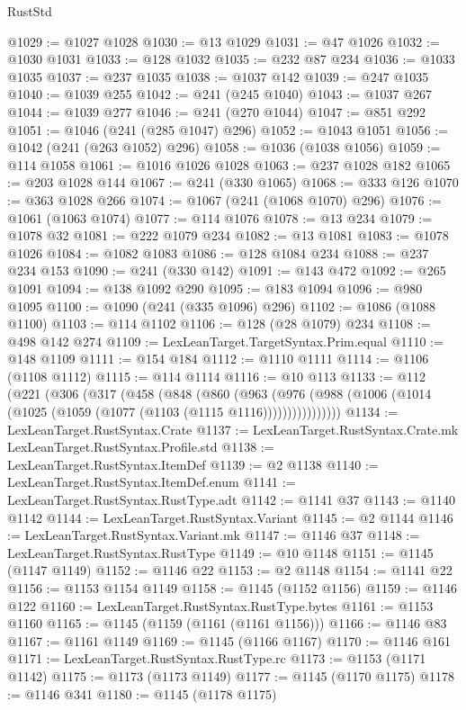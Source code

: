 \begin{lexlean}{RustStd}
\begin{coremodule}
@1029 := @1027 @1028
@1030 := @13 @1029
@1031 := @47 @1026
@1032 := @1030 @1031
@1033 := @128 @1032
@1035 := @232 @87 @234
@1036 := @1033 @1035
@1037 := @237 @1035
@1038 := @1037 @142
@1039 := @247 @1035
@1040 := @1039 @255
@1042 := @241 (@245 @1040)
@1043 := @1037 @267
@1044 := @1039 @277
@1046 := @241 (@270 @1044)
@1047 := @851 @292
@1051 := @1046 (@241 (@285 @1047) @296)
@1052 := @1043 @1051
@1056 := @1042 (@241 (@263 @1052) @296)
@1058 := @1036 (@1038 @1056)
@1059 := @114 @1058
@1061 := @1016 @1026 @1028
@1063 := @237 @1028 @182
@1065 := @203 @1028 @144
@1067 := @241 (@330 @1065)
@1068 := @333 @126
@1070 := @363 @1028 @266
@1074 := @1067 (@241 (@1068 @1070) @296)
@1076 := @1061 (@1063 @1074)
@1077 := @114 @1076
@1078 := @13 @234
@1079 := @1078 @32
@1081 := @222 @1079 @234
@1082 := @13 @1081
@1083 := @1078 @1026
@1084 := @1082 @1083
@1086 := @128 @1084 @234
@1088 := @237 @234 @153
@1090 := @241 (@330 @142)
@1091 := @143 @472
@1092 := @265 @1091
@1094 := @138 @1092 @290
@1095 := @183 @1094
@1096 := @980 @1095
@1100 := @1090 (@241 (@335 @1096) @296)
@1102 := @1086 (@1088 @1100)
@1103 := @114 @1102
@1106 := @128 (@28 @1079) @234
@1108 := @498 @142 @274
@1109 := LexLeanTarget.TargetSyntax.Prim.equal
@1110 := @148 @1109
@1111 := @154 @184
@1112 := @1110 @1111
@1114 := @1106 (@1108 @1112)
@1115 := @114 @1114
@1116 := @10 @113
@1133 := @112
    (@221
      (@306
        (@317
          (@458
            (@848
              (@860
                (@963
                  (@976 (@988 (@1006 (@1014 (@1025 (@1059 (@1077 (@1103 (@1115 @1116))))))))))))))))
@1134 := LexLeanTarget.RustSyntax.Crate
@1137 := LexLeanTarget.RustSyntax.Crate.mk LexLeanTarget.RustSyntax.Profile.std
@1138 := LexLeanTarget.RustSyntax.ItemDef
@1139 := @2 @1138
@1140 := LexLeanTarget.RustSyntax.ItemDef.enum
@1141 := LexLeanTarget.RustSyntax.RustType.adt
@1142 := @1141 @37
@1143 := @1140 @1142
@1144 := LexLeanTarget.RustSyntax.Variant
@1145 := @2 @1144
@1146 := LexLeanTarget.RustSyntax.Variant.mk
@1147 := @1146 @37
@1148 := LexLeanTarget.RustSyntax.RustType
@1149 := @10 @1148
@1151 := @1145 (@1147 @1149)
@1152 := @1146 @22
@1153 := @2 @1148
@1154 := @1141 @22
@1156 := @1153 @1154 @1149
@1158 := @1145 (@1152 @1156)
@1159 := @1146 @122
@1160 := LexLeanTarget.RustSyntax.RustType.bytes
@1161 := @1153 @1160
@1165 := @1145 (@1159 (@1161 (@1161 @1156)))
@1166 := @1146 @83
@1167 := @1161 @1149
@1169 := @1145 (@1166 @1167)
@1170 := @1146 @161
@1171 := LexLeanTarget.RustSyntax.RustType.rc
@1173 := @1153 (@1171 @1142)
@1175 := @1173 (@1173 @1149)
@1177 := @1145 (@1170 @1175)
@1178 := @1146 @341
@1180 := @1145 (@1178 @1175)

\end{coremodule}
\end{lexlean}
